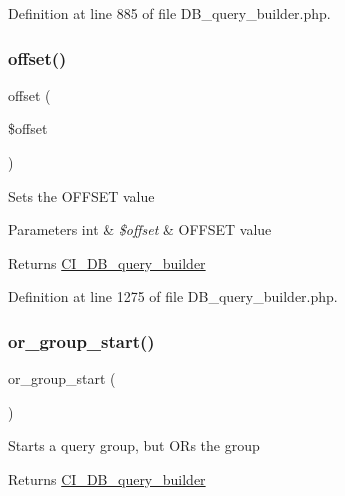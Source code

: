 Definition at line 885 of file D\+B\+\_\+query\+\_\+builder.\+php.

\mbox{\label{class_c_i___d_b__query__builder_afd31b65425a2b5cf30711bf29e1b1851}} 
\subsubsection{\texorpdfstring{offset()}{offset()}}
{\footnotesize\ttfamily offset (\begin{DoxyParamCaption}\item[{}]{\$offset }\end{DoxyParamCaption})}

Sets the O\+F\+F\+S\+ET value


\begin{DoxyParams}[1]{Parameters}
int & {\em \$offset} & O\+F\+F\+S\+ET value \\
\hline
\end{DoxyParams}
\begin{DoxyReturn}{Returns}
\mbox{\hyperlink{class_c_i___d_b__query__builder}{C\+I\+\_\+\+D\+B\+\_\+query\+\_\+builder}} 
\end{DoxyReturn}


Definition at line 1275 of file D\+B\+\_\+query\+\_\+builder.\+php.

\mbox{\label{class_c_i___d_b__query__builder_a80d5e4a0d8f2d0f202e8df6816865838}} 
\subsubsection{\texorpdfstring{or\_group\_start()}{or\_group\_start()}}
{\footnotesize\ttfamily or\+\_\+group\+\_\+start (\begin{DoxyParamCaption}{ }\end{DoxyParamCaption})}

Starts a query group, but O\+Rs the group

\begin{DoxyReturn}{Returns}
\mbox{\hyperlink{class_c_i___d_b__query__builder}{C\+I\+\_\+\+D\+B\+\_\+query\+\_\+builder}} 
\end{DoxyReturn}


